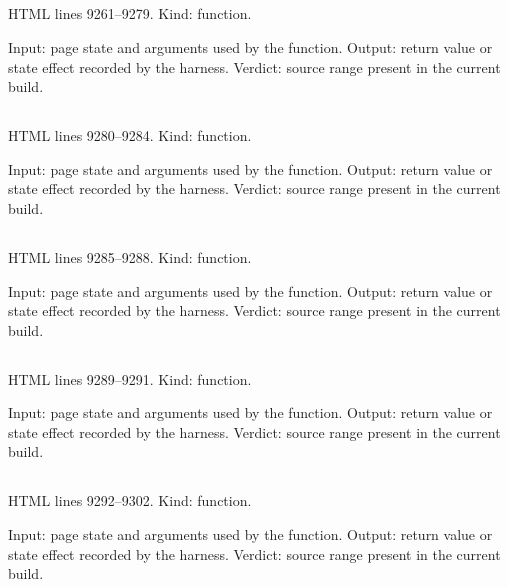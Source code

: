 \subsection*{\texttt{}}
\label{vf_503_reviewRunRows}
HTML lines 9261--9279. Kind: function.

Input: page state and arguments used by the function.
Output: return value or state effect recorded by the harness.
Verdict: source range present in the current build.

\subsection*{\texttt{}}
\label{vf_504_stripLotDate}
HTML lines 9280--9284. Kind: function.

Input: page state and arguments used by the function.
Output: return value or state effect recorded by the harness.
Verdict: source range present in the current build.

\subsection*{\texttt{}}
\label{vf_505_controlRootName}
HTML lines 9285--9288. Kind: function.

Input: page state and arguments used by the function.
Output: return value or state effect recorded by the harness.
Verdict: source range present in the current build.

\subsection*{\texttt{}}
\label{vf_506_controlRootKey}
HTML lines 9289--9291. Kind: function.

Input: page state and arguments used by the function.
Output: return value or state effect recorded by the harness.
Verdict: source range present in the current build.

\subsection*{\texttt{}}
\label{vf_507_controlProfileRoot}
HTML lines 9292--9302. Kind: function.

Input: page state and arguments used by the function.
Output: return value or state effect recorded by the harness.
Verdict: source range present in the current build.

